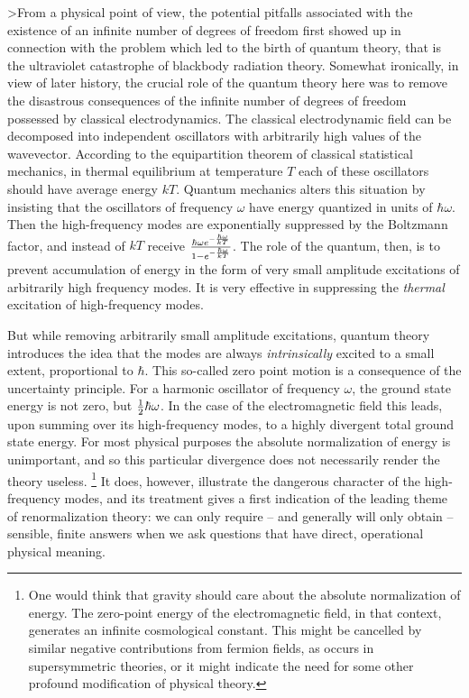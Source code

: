 \documentclass[aps,epsf]{revtex4}
\begin{document}
>From a physical point of view, the potential pitfalls associated with
the existence of an infinite number of degrees of freedom first showed
up in connection with the problem which led to the birth of quantum
theory, that is the ultraviolet catastrophe of blackbody radiation
theory.  Somewhat ironically, in view of later history, the crucial
role of the quantum theory here was to remove the disastrous
consequences of the infinite number of degrees of freedom possessed by
classical electrodynamics.  The classical electrodynamic field can be
decomposed into independent oscillators with arbitrarily high values
of the wavevector.  According to the equipartition theorem of
classical statistical mechanics, in thermal equilibrium at temperature
$T$ each of these oscillators should have average energy $kT$.
Quantum mechanics alters this situation by insisting that the
oscillators of frequency $\omega$ have energy quantized in units of
$\hbar \omega$.  Then the high-frequency modes are exponentially
suppressed by the Boltzmann factor, and instead of $kT$ receive
${\hbar \omega e^{-{\hbar \omega\over kT}} \over 1- e^{-{\hbar
\omega\over kT}}}$.  The role of the quantum, then, is to prevent
accumulation of energy in the form of very small amplitude excitations
of arbitrarily high frequency modes.  It is very effective in
suppressing the {\it thermal\/} excitation of high-frequency modes.

But while removing arbitrarily small amplitude
excitations, quantum theory introduces the idea that the modes are
always {\it intrinsically\/} excited to a small extent, proportional
to $\hbar$.  This so-called zero point motion is a consequence of the
uncertainty principle.  For a harmonic oscillator of frequency
$\omega$, the ground state energy is not zero, but ${1\over 2} \hbar
\omega$.  In the case of the electromagnetic field this leads, upon
summing over its high-frequency modes, to a highly divergent total
ground state energy.  For most physical purposes the absolute
normalization of energy is unimportant, and so this particular
divergence does not necessarily render the theory useless.  \footnote{One
would think that gravity should care about the absolute normalization
of energy.  The zero-point energy of the electromagnetic field, in
that context, generates an infinite cosmological constant.  This might
be cancelled by similar negative contributions from fermion fields, as
occurs in supersymmetric theories, or it might indicate the need for
some other profound modification of physical theory.}  It does,
however, illustrate the dangerous character of the high-frequency
modes, and its treatment gives a first indication of the leading theme
of renormalization theory: we can only require -- and generally will
only obtain -- sensible, finite answers when we ask questions that
have direct, operational physical meaning.  
\end{document}
